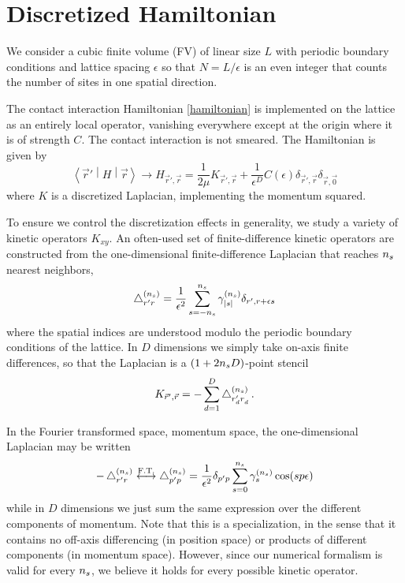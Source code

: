 \section{Discretized Hamiltonian}\label{sec:hamiltonian}

We consider a cubic finite volume (FV) of linear size $L$ with periodic boundary conditions and lattice spacing $\epsilon$ so that $N=L/\epsilon$ is an even integer that counts the number of sites in one spatial direction.

The contact interaction Hamiltonian \eqref{hamiltonian} is implemented on the lattice as an entirely local operator, vanishing everywhere except at the origin where it is of strength $C$.
The contact interaction is not smeared.
The Hamiltonian is given by
\begin{equation}
    \left\langle \vec{r}' \middle| H \middle| \vec{r} \right\rangle
    \rightarrow
    H_{\vec{r}',\vec{r}}
    =
    \frac{1}{2\mu} K_{\vec{r}',\vec{r}} + \frac{1}{\epsilon^D} C(\epsilon) \delta_{\vec{r}',\vec{r}} \delta_{\vec{r},\vec{0}}
\end{equation}
where $K$ is a discretized Laplacian, implementing the momentum squared.

To ensure we control the discretization effects in generality, we study a variety of kinetic operators $K_{xy}$.
An often-used set of finite-difference kinetic operators are constructed from the one-dimensional finite-difference Laplacian that reaches ${n_s}$ nearest neighbors,
\begin{equation}
    \mathop{}\!\mathbin\bigtriangleup^{({n_s})}_{r'r} = \frac{1}{\epsilon^2}\sum_{s=-{n_s}}^{{n_s}} \gamma_{\left| s \right|}^{({n_s})} \delta_{r',r+\epsilon s}
\end{equation}
where the spatial indices are understood modulo the periodic boundary conditions of the lattice.
In $D$ dimensions we simply take on-axis finite differences, so that the Laplacian is a $(1+2{n_s} D)$-point stencil
\begin{equation}\label{eq:kinetic}
    K_{\vec{r}',\vec{r}}
    =
    - \sum_{d=1}^D \mathop{}\!\mathbin\bigtriangleup_{r_d'r_d^{}}^{({n_s})}
    \, .
\end{equation}

In the Fourier transformed space, momentum space, the one-dimensional Laplacian may be written
\begin{equation}
    \label{eq:laplacian}
    -\mathop{}\!\mathbin\bigtriangleup_{r'r^{}}^{({n_s})}
    \overset{\text{F.T.}}{\longleftrightarrow}
    \mathop{}\!\mathbin\bigtriangleup^{({n_s})}_{p'p}
    =
    \frac{1}{\epsilon^2}
    \delta_{p'p}
    \sum_{s=0}^{{n_s}} \gamma_s^{({n_s})} \cos(s p \epsilon)
\end{equation}
while in $D$ dimensions we just sum the same expression over the different components of momentum.
Note that this is a specialization, in the sense that it contains no off-axis differencing (in position space) or products of different components (in momentum space).
However, since our numerical formalism is valid for every ${n_s}$, we believe it holds for every possible kinetic operator.

